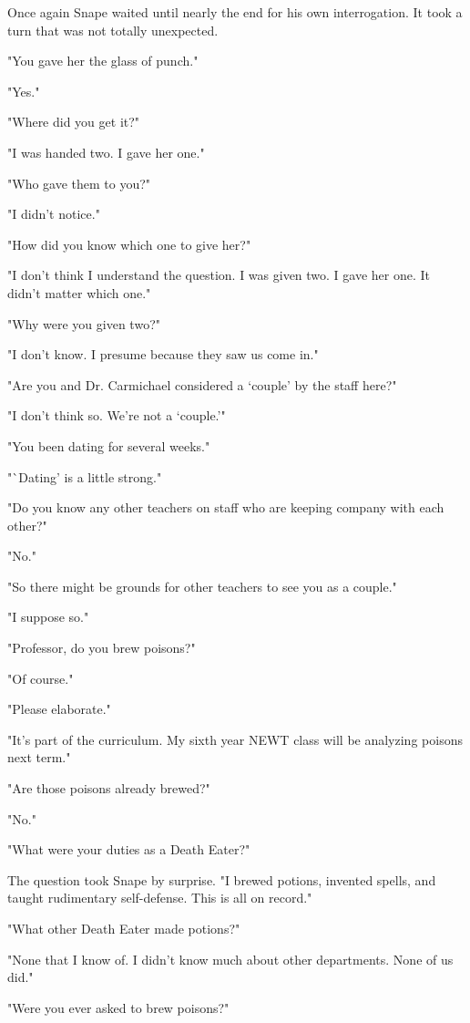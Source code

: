 Once again Snape waited until nearly the end for his own interrogation. It took a turn that was not totally unexpected.

"You gave her the glass of punch."

"Yes."

"Where did you get it?"

"I was handed two. I gave her one."

"Who gave them to you?"

"I didn't notice."

"How did you know which one to give her?"

"I don't think I understand the question. I was given two. I gave her one. It didn't matter which one."

"Why were you given two?"

"I don't know. I presume because they saw us come in."

"Are you and Dr. Carmichael considered a `couple' by the staff here?"

"I don't think so. We're not a `couple.'"

"You been dating for several weeks."

"`Dating' is a little strong."

"Do you know any other teachers on staff who are keeping company with each other?"

"No."

"So there might be grounds for other teachers to see you as a couple."

"I suppose so."

"Professor, do you brew poisons?"

"Of course."

"Please elaborate."

"It's part of the curriculum. My sixth year NEWT class will be analyzing poisons next term."

"Are those poisons already brewed?"

"No."

"What were your duties as a Death Eater?"

The question took Snape by surprise. "I brewed potions, invented spells, and taught rudimentary self-defense. This is all on record."

"What other Death Eater made potions?"

"None that I know of. I didn't know much about other departments. None of us did."

"Were you ever asked to brew poisons?"

